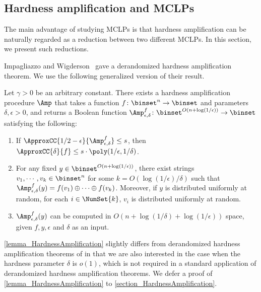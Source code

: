 \documentclass{toc}
\begin{document}
%
%
%


\subsection{Hardness amplification and MCLPs}
\label{section_KtandHSG}

The main advantage of studying MCLPs is that
hardness amplification can be naturally regarded as a reduction
between two different MCLPs.
In this section, we present such reductions.

Impagliazzo and Wigderson~\cite{ImpagliazzoW97_stoc_conf} gave a derandomized hardness amplification theorem.
We use the following generalized version of their result.
\begin{theorem}
  \label{lemma_HardnessAmplification}
  Let $\gamma > 0$ be an arbitrary constant.
  There exists a hardness amplification procedure $\Amp$
  that takes a function $f \colon \binset^n \to \binset$ and parameters $\delta, \epsilon > 0$,
  and returns
  a Boolean function
  $\Amp_{\epsilon, \delta}^f \colon \binset^{O(n + \log (1/\epsilon))} \to \binset$
  satisfying the following:
  \begin{enumerate}
    \item
          \label{item_AmpApprox}
          If $\ApproxCC{1/2 - \epsilon}{\Amp_{\epsilon, \delta}^f} \le s$,
          then
          $\ApproxCC{\delta}{f} \le s \cdot \poly(1/\epsilon, 1/\delta)$.
    \item  \label{item_AmpXOR}
          For any fixed $y \in \binset^{O(n + \log (1 / \epsilon))}$,
          there exist strings $v_1, \cdots, v_k \in \binset^{n}$
          for some $k = O(\log (1 / \epsilon) / \delta)$
          such that
          $\Amp_{\epsilon, \delta}^f(y) =  f(v_1) \oplus \cdots \oplus f(v_k)$.
          Moreover, if $y$ is distributed uniformly at random,
          for each $i \in \NumSet{k}$,
          $v_i$ is distributed uniformly at random.
    \item \label{item_AmpKS}
          $\Amp_{\epsilon, \delta}^f(y)$ can be computed in $O(n + \log (1 / \delta) + \log (1 / \epsilon))$ space,
          given $f, y, \epsilon$ and $\delta$ as an input.
  \end{enumerate}
\end{theorem}
\cref{lemma_HardnessAmplification} slightly differs from derandomized hardness amplification theorems of \cite{ImpagliazzoW97_stoc_conf, HealyVV06_siamcomp_journals} in that
we are also interested in the case when the hardness parameter $\delta$ is $o(1)$,
which is not required in a standard application of derandomized hardness amplification theorems.
We defer a proof of \cref{lemma_HardnessAmplification} to \cref{section_HardnessAmplification}.
%
\end{document}

